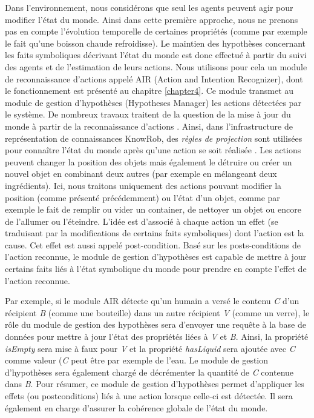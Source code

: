 \documentclass[a4paper,11pt,twoside]{StyleThese}
\begin{document}
Dans l'environnement, nous considérons que seul les agents peuvent agir pour modifier l'état du monde. Ainsi dans cette première approche, nous ne prenons pas en compte l'évolution temporelle de certaines propriétés (comme par exemple le fait qu'une boisson chaude refroidisse).
Le maintien des hypothèses concernant les faits symboliques décrivant l'état du monde est donc effectué à partir du suivi des agents et de l'estimation de leurs actions. Nous utilisons pour cela un module de reconnaissance d'actions appelé AIR (Action and Intention Recognizer), dont le fonctionnement est présenté au chapitre \ref{chapter4}.
Ce module transmet au module de gestion d'hypothèses (Hypotheses Manager) les actions détectées par le système.
De nombreux travaux traitent de la question de la mise à jour du monde à partir de la reconnaissance d'actions \cite{ginsberg1988reasoning,ginsberg1988reasoning2,rao1989minimal,jackson1990semantic,brewka1993things}.
Ainsi, dans l'infrastructure de représentation de connaissances KnowRob, des \textit{règles de projection} sont utilisées pour connaître l'état du monde après qu'une action se soit réalisée \cite{tenorth2015representations}. Les actions peuvent changer la position des objets mais également le détruire ou créer un nouvel objet en combinant deux autres (par exemple en mélangeant deux ingrédients). Ici, nous traitons uniquement des actions pouvant modifier la position (comme présenté précédemment) ou l'état d'un objet, comme par exemple le fait de remplir ou vider un container, de nettoyer un objet ou encore de l'allumer ou l'éteindre. L'idée est d'associé à chaque action un effet (se traduisant par la modifications de certains faits symboliques) dont l'action est la cause. Cet effet est aussi appelé post-condition. Basé sur les posts-conditions de l'action reconnue, le module de gestion d'hypothèses est capable de mettre à jour certains faits liés à l'état symbolique du monde pour prendre en compte l'effet de l'action reconnue.

Par exemple, si le module AIR détecte qu'un humain a versé le contenu \textit{C} d'un récipient \textit{B} (comme une bouteille) dans un autre récipient \textit{V} (comme un verre), le rôle du module de gestion des hypothèses sera d'envoyer une requête à la base de données pour mettre à jour l'état des propriétés liées à \textit{V} et \textit{B}. Ainsi, la propriété \textit{isEmpty} sera mise à faux pour \textit{V} et la propriété \textit{hasLiquid} sera ajoutée avec \textit{C} comme valeur (\textit{C} peut être par exemple de l'eau. Le module de gestion d'hypothèses sera également chargé de décrémenter la quantité de \textit{C} contenue dans \textit{B}.
Pour résumer, ce module de gestion d'hypothèses permet d'appliquer les effets (ou postconditions) liés à une action lorsque celle-ci est détectée. Il sera également en charge d'assurer la cohérence globale de l'état du monde.
\end{document}
